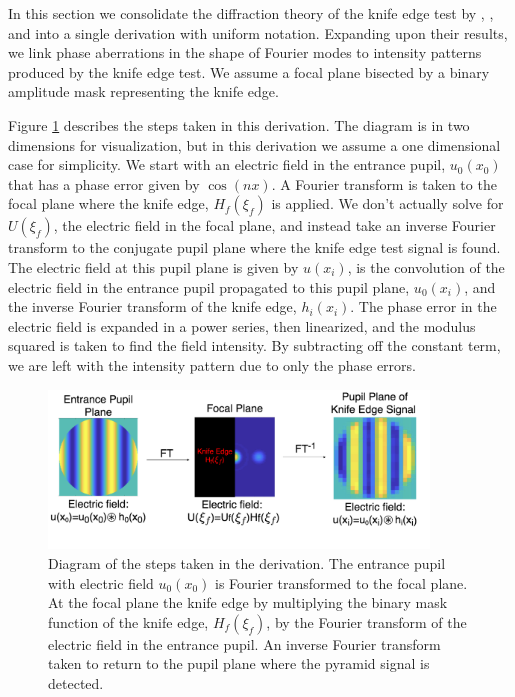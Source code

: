  In this section we consolidate the diffraction theory of the knife edge test by \citep{linfoot1948theory}, \citep{katzoff1971quantitative}, and \citep{wilson1975wavefront} into a single derivation with uniform notation. Expanding upon their results, we link phase aberrations in the shape of Fourier modes to intensity patterns produced by the knife edge test. We assume a focal plane bisected by a binary amplitude mask representing the knife edge. 
 
 Figure \ref{fig:derivationFlow} describes the steps taken in this derivation. The diagram is in two dimensions for visualization, but in this derivation we assume a one dimensional case for simplicity. We start with an electric field in the entrance pupil, $u_0(x_0)$ that has a phase error given by $\cos(nx)$. A Fourier transform is taken to the focal plane where the knife edge, $H_f(\xi_f)$ is applied. We don't actually solve for $U(\xi_f)$, the electric field in the focal plane, and instead take an inverse Fourier transform to the conjugate pupil plane where the knife edge test signal is found. The electric field at this pupil plane is given by $u(x_i)$, is the convolution of the electric field in the entrance pupil propagated to this pupil plane, $u_0(x_i)$, and the inverse Fourier transform of the knife edge, $h_i(x_i)$. The phase error in the electric field is expanded in a power series, then linearized, and the modulus squared is taken to find the field intensity. By subtracting off the constant term, we are left with the intensity pattern due to only the phase errors. 
 
 
 
 \begin{figure}
     \centering
     \includegraphics[width=0.9\textwidth]{Chapter Materials/Chapter Two Materials/DerivationFlow.png}
     \caption{Diagram of the steps taken in the derivation. The entrance pupil with electric field $u_0(x_0)$ is Fourier transformed to the focal plane. At the focal plane the knife edge by multiplying the binary mask function of the knife edge, $H_f(\xi_f)$, by the Fourier transform of the electric field in the entrance pupil. An inverse Fourier transform taken to return to the pupil plane where the pyramid signal is detected.}
     \label{fig:derivationFlow}
 \end{figure}
 
